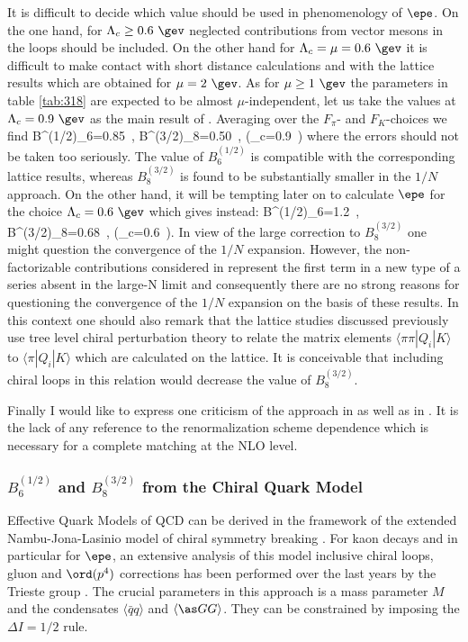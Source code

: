 It is difficult to decide which value should be used in phenomenology
of $\epe$. On the one hand, for $\Lambda_c\ge 0.6~\gev$ neglected 
contributions from vector mesons in the loops should be included.
On the other hand for $\Lambda_c=\mu= 0.6~\gev$ it is difficult
to make contact with short distance calculations and with the
lattice results which are obtained for $\mu=2~\gev$. As for
$\mu \ge 1~\gev$ the parameters in table \ref{tab:318} are expected to be
almost $\mu$-independent, let us take the values at $\Lambda_c=0.9~\gev$
as the main result of \cite{DORT98}. 
Averaging over the $F_\pi$- and $F_K$-choices
we find
\be\label{LNN}
B^{(1/2)}_{6}=0.85~, \quad\quad B^{(3/2)}_{8}=0.50~,
\quad\quad(\Lambda_c=0.9~\gev)
\ee
where the errors should not be taken too seriously. The value
of $B^{(1/2)}_{6}$ is compatible with the corresponding lattice 
results, whereas $ B^{(3/2)}_{8}$ is found to be substantially
smaller in the $1/N$ approach. On the other hand, it will be
tempting later on to calculate $\epe$ for the choice 
$\Lambda_c=0.6~\gev$ which gives instead:
\be\label{LNN1}
B^{(1/2)}_{6}=1.2~, \quad\quad B^{(3/2)}_{8}=0.68~,
\quad\quad (\Lambda_c=0.6~\gev).
\ee
In view of the large correction to
$B^{(3/2)}_{8}$ one might question the convergence of the $1/N$
expansion. However, the non-factorizable contributions
considered in \cite{DORT98} represent the first term in a new type 
of a series
absent in the large-N limit and consequently there are no strong
reasons for questioning the convergence of the $1/N$ expansion on
the basis of these results. In this context one should also
remark that the lattice studies discussed previously use tree level
chiral perturbation theory to relate the matrix elements
$\langle \pi\pi| Q_i|K\rangle $ to $\langle\pi| Q_i|K\rangle $
which are calculated on the lattice. It is conceivable that
including chiral loops in this relation would decrease the
value of $ B^{(3/2)}_{8}$.

Finally I would like to express one criticism of the approach
in \cite{DORT98} as well as in 
\cite{bardeen:87}. It is the lack of any reference to the
renormalization scheme dependence which is necessary for
a complete matching at the NLO level.

\subsubsection{$B^{(1/2)}_{6}$ and $B^{(3/2)}_{8}$ from 
the Chiral Quark Model}
Effective Quark Models of QCD can be derived in the framework of 
the extended Nambu-Jona-Lasinio model of chiral symmetry 
breaking \cite{NJL}.
For kaon decays and in particular for $\epe$, an extensive analysis
of this model inclusive chiral loops, gluon and $\ord(p^4)$ corrections
has been performed over the last years by the Trieste group
\cite{TR96,TR97}. The
crucial parameters in this approach is a mass parameter $M$ and
the condensates $\langle\bar q q\rangle $ and $\langle\as GG\rangle$.
They can be constrained by imposing the $\Delta I=1/2$ rule.

